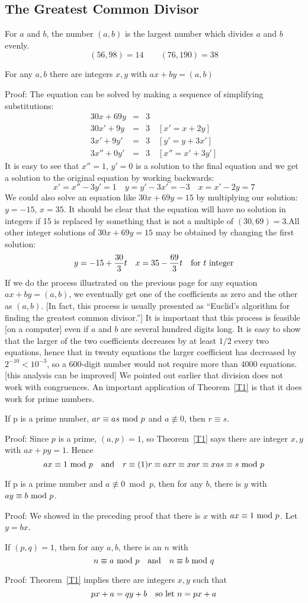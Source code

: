 \subsection{The Greatest Common Divisor}
For $a$ and $b$, the number $(a,b)$ is the largest number which
divides $a$ and $b$ evenly. $$(56,98)=14\qquad(76,190)=38$$\begin{Th}
\label{T1}For any $a,b$ there are integers $x,y$ with $ax+by=(a,b)$\end{Th}
Proof: The equation can be solved by making a sequence of simplifying
substitutions:\begin{eqnarray*}30x+69y&=&3\\30x'+9y&=&3\quad[x'=x+2y]\\
3x'+9y'&=&3\quad[y'=y+3x']\\3x''+0y'&=&3\quad[x''=x'+3y']\end{eqnarray*}
It is easy to see that $x''=1$, $y'=0$ is a solution to the final
equation and we get a solution to the original equation by working
backwards:$$x'=x''-3y'=1\quad y=y'-3x'=-3\quad x=x'-2y=7$$
\pq We could also solve an equation like $30x+69y=15$ by multiplying
our solution: $y=-15$, $x=35$.  It should be clear that the equation
will have no solution in integers if 15 is replaced by something
that is not a multiple of $(30,69)=3$.\pq All other integer solutions of
$30x+69y=15$ may be obtained by changing the first solution:
$$y=-15+\frac{30}3t\quad x=35-\frac{69}3t\quad\hbox{for $t$ integer}$$
\pq If we do the process illustrated on the previous page for any
equation $ax+by=(a,b)$, we eventually get one of the coefficients
as zero and the other as $(a,b)$.  [In fact, this process is usually
presented as ``Euclid's algorithm for finding the greatest common
divisor.'']
\pq It is important that this process is feasible [on a computer]
even if $a$ and $b$ are several hundred digits long.  It is easy
to show that the larger of the two coefficients decreases by at 
least $1/2$ every two equations, hence that in twenty equations
the larger coefficient has decreased by $2^{-10}<10^{-3}$, so
a 600-digit number would not require more than 4000 equations.
[this analysis can be improved]
\pq We pointed out earlier that division does not work with congruences.
An important application of Theorem~\ref{T1} is that it does work for prime
numbers.\begin{Co} If p is a prime number, $ar\equiv as\hbox{ mod }p$ and 
$a\not\equiv 0$, then $r\equiv s$.\end{Co}
Proof: Since $p$ is a prime,
$(a,p)=1$, so Theorem~\ref{T1} says there are integer $x,y$ with $ax+py=1$.
Hence $$ax\equiv1\hbox{ mod }p\quad\hbox{and}\quad r\equiv(1)r\equiv axr\equiv xar
\equiv xas\equiv s\hbox{ mod }p$$
\begin{Co}If p is a prime number and $a\not\equiv0$~mod~$p$, then
for any $b$, there is $y$ with $ay\equiv b\hbox{ mod }p$.\end{Co}
Proof: We showed in the preceding proof that there is $x$ with
$ax\equiv1\hbox{ mod }p$.  Let $y=bx$.
\begin{Co} If $(p,q)=1$, then
for any $a,b$, there is an $n$ with $$n\equiv a\hbox{ mod }p\quad
\hbox{and}\quad n\equiv b\hbox{ mod }q$$\end{Co}
Proof: Theorem~\ref{T1} implies there are integers $x,y$ such that
$$px+a=qy+b\quad\hbox{so let }n=px+a$$
